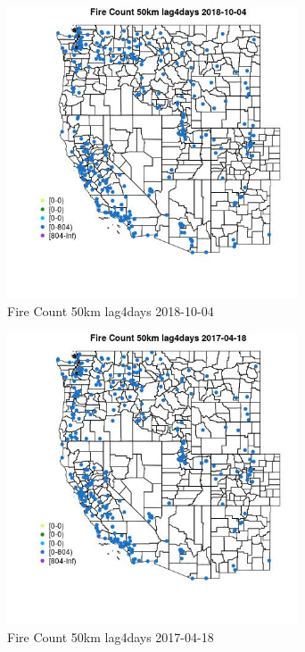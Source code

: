 \begin{figure} 
\centering  
\includegraphics[width=0.77\textwidth]{Code_Outputs/Report_ML_input_PM25_Step4_part_f_de_duplicated_aves_prioritize_24hr_obswNAs_MapObsFire_Count_50km_lag4days2018-10-04.jpg} 
\caption{\label{fig:Report_ML_input_PM25_Step4_part_f_de_duplicated_aves_prioritize_24hr_obswNAsMapObsFire_Count_50km_lag4days2018-10-04}Fire Count 50km lag4days 2018-10-04} 
\end{figure} 
 

\begin{figure} 
\centering  
\includegraphics[width=0.77\textwidth]{Code_Outputs/Report_ML_input_PM25_Step4_part_f_de_duplicated_aves_prioritize_24hr_obswNAs_MapObsFire_Count_50km_lag4days2017-04-18.jpg} 
\caption{\label{fig:Report_ML_input_PM25_Step4_part_f_de_duplicated_aves_prioritize_24hr_obswNAsMapObsFire_Count_50km_lag4days2017-04-18}Fire Count 50km lag4days 2017-04-18} 
\end{figure} 
 

